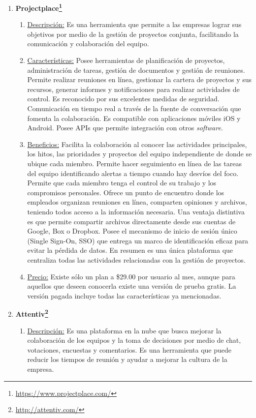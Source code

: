 \begin{enumerate}[1.]
    \item \textbf{Projectplace\footnote{\url{https://www.projectplace.com/}}}
    \begin{enumerate}[a]
	    \item \underline{Descripción:} Es una herramienta que permite a las empresas lograr sus objetivos por medio de la gestión de proyectos conjunta, facilitando la comunicación y colaboración del equipo. 
		\item \underline{Características:} Posee herramientas de planificación de proyectos, administración de tareas, gestión de documentos y gestión de reuniones. Permite realizar reuniones en línea, gestionar la cartera de proyectos y sus recursos, generar informes y notificaciones para realizar actividades de control. Es reconocido por sus excelentes medidas de seguridad. Comunicación en tiempo real a través de la fuente de conversación que fomenta la colaboración. Es compatible con aplicaciones móviles iOS y Android. Posee APIs que permite integración con otros \textit{software}.
	    \item \underline{Beneficios:} Facilita la colaboración al conocer las actividades principales, los hitos, las prioridades y proyectos del equipo independiente de donde se ubique cada miembro. Permite hacer seguimiento en línea de las tareas del equipo identificando alertas a tiempo cuando hay desvíos del foco. Permite que cada miembro tenga el control de su trabajo y los compromisos personales. Ofrece un punto de encuentro donde los empleados organizan reuniones en línea, comparten opiniones y archivos, teniendo todos acceso a la información necesaria. Una ventaja distintiva es que permite compartir archivos directamente desde sus cuentas de Google, Box o Dropbox. Posee el mecanismo de inicio de sesión único (Single Sign-On, SSO) que entrega un marco de identificación eficaz para evitar la pérdida de datos. En resumen es una única plataforma que centraliza todas las actividades relacionadas con la gestión de proyectos.
	    \item \underline{Precio:}  Existe sólo un plan a \$29.00 por usuario al mes, aunque para aquellos que deseen conocerla existe una versión de prueba gratis. La versión pagada incluye todas las características ya mencionadas. 
    \end{enumerate}	
    \item \textbf{Attentiv\footnote{\url{http://attentiv.com/}}}
    \begin{enumerate}[a]
	    \item \underline{Descripción:} Es una plataforma en la nube que busca mejorar la colaboración de los equipos y la toma de decisiones por medio de chat, votaciones, encuestas y comentarios. Es una herramienta que puede reducir los tiempos de reunión y ayudar a mejorar la cultura de la empresa. 

\end{enumerate}
\end{enumerate}
